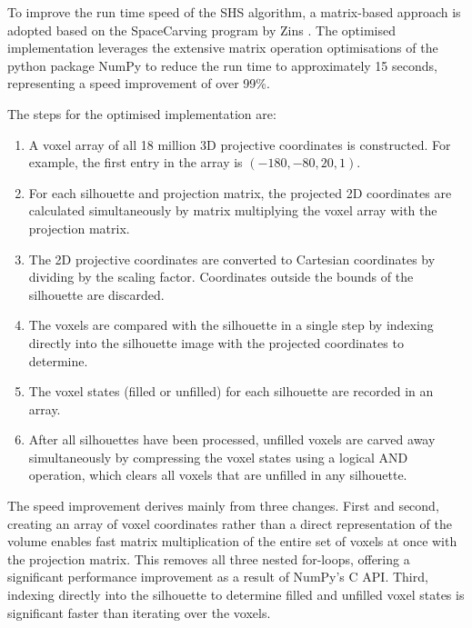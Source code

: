 To improve the run time speed of the SHS algorithm, a matrix-based approach is adopted based on the SpaceCarving program by Zins \cite{zins_2019}. The optimised implementation leverages the extensive matrix operation optimisations of the python package NumPy to reduce the run time to approximately 15 seconds, representing a speed improvement of over 99\%.

The steps for the optimised implementation are:
\begin{enumerate}
  \item A voxel array of all 18 million 3D projective coordinates is constructed. For example, the first entry in the array is $(-180, -80, 20, 1)$.

  \item For each silhouette and projection matrix, the projected 2D coordinates are calculated simultaneously by matrix multiplying the voxel array with the projection matrix.

  \item The 2D projective coordinates are converted to Cartesian coordinates by dividing by the scaling factor. Coordinates outside the bounds of the silhouette are discarded.

  \item The voxels are compared with the silhouette in a single step by indexing directly into the silhouette image with the projected coordinates to determine.

  \item The voxel states (filled or unfilled) for each silhouette are recorded in an array.

  \item After all silhouettes have been processed, unfilled voxels are carved away simultaneously by compressing the voxel states using a logical AND operation, which clears all voxels that are unfilled in any silhouette.

\end{enumerate}

The speed improvement derives mainly from three changes. First and second, creating an array of voxel coordinates rather than a direct representation of the volume enables fast matrix multiplication of the entire set of voxels at once with the projection matrix. This removes all three nested for-loops, offering a significant performance improvement as a result of NumPy's C API. Third, indexing directly into the silhouette to determine filled and unfilled voxel states is significant faster than iterating over the voxels.

